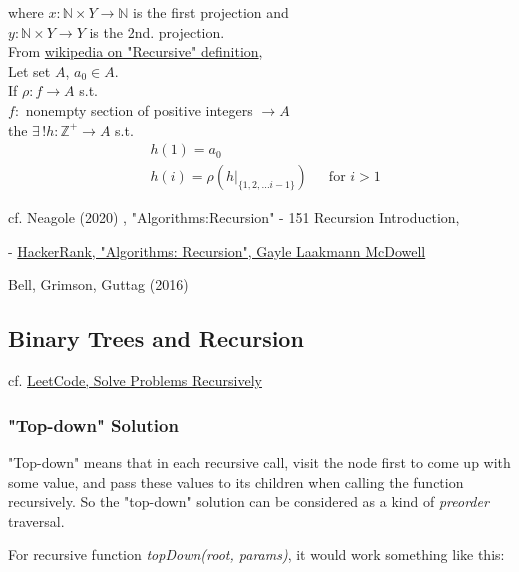 \documentclass[10pt]{amsart}
\begin{document}
where $x: \mathbb{N} \times Y \to \mathbb{N}$ is the first projection and \\
\phantom{where } $y : \mathbb{N} \times Y \to Y$ is the 2nd. projection.  \\

From \href{https://en.wikipedia.org/wiki/Recursive_definition}{wikipedia on "Recursive" definition}, \\
Let set $A$, $a_0 \in A$. \\
If $\rho : f \to A$ s.t. \\
\phantom{If $\rho $ } $f: $ nonempty section of positive integers $\to A$ \\
the $\exists \, ! h : \mathbb{Z}^+ \to A$ s.t. \\
\begin{equation}
\begin{aligned}
& h(1) = a_0 \\ 
& h(i) = \rho( \left. h \right|_{\lbrace 1, 2, \dots i -1 \rbrace }) \quad \, \text{ for } i > 1
\end{aligned}
\end{equation}

cf. Neagole (2020) \cite{Neag2020}, "Algorithms:Recursion" - 151 Recursion Introduction, 


- \href{https://youtu.be/KEEKn7Me-ms}{HackerRank, "Algorithms: Recursion",  Gayle Laakmann McDowell}

Bell, Grimson, Guttag (2016) \cite{BGG2016}


\subsection{Binary Trees and Recursion}

cf. \href{https://leetcode.com/explore/learn/card/data-structure-tree/17/solve-problems-recursively/534/}{LeetCode, Solve Problems Recursively}

\subsubsection{"Top-down" Solution}

"Top-down" means that in each recursive call, visit the node first to come up with some value, and pass these values to its children when calling the function recursively. So the "top-down" solution can be considered as a kind of \emph{preorder} traversal.

For recursive function \emph{topDown(root, params)}, it would work something like this:
\end{document}
